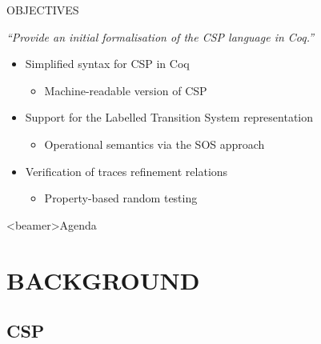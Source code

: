 \documentclass[t]{beamer}
\begin{document}
\begin{frame}{OBJECTIVES}
	\begin{center}
		\emph{``Provide an initial formalisation of the CSP language in Coq.''}
	\end{center}
	\begin{itemize}
		\item Simplified syntax for CSP in Coq
		\begin{itemize}
			\item Machine-readable version of CSP
		\end{itemize}
		\item Support for the Labelled Transition System representation
		\begin{itemize}
			\item Operational semantics via the SOS approach
		\end{itemize}
		\item Verification of traces refinement relations
		\begin{itemize}
			\item Property-based random testing
		\end{itemize}
	\end{itemize}
\end{frame}

\begin{frame}<beamer>{Agenda}
	\tableofcontents
\end{frame}

\section{BACKGROUND}

\subsection{CSP}
\end{document}
